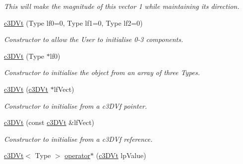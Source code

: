 \begin{DoxyCompactItemize}
\begin{DoxyCompactList}\small\item\em This will make the magnitude of this vector 1 while maintaining its direction. \end{DoxyCompactList}\item 
\hypertarget{classc3_d_vt_ac477f1d395ac545f8e2d2563cd1b4f47}{
\hyperlink{classc3_d_vt_ac477f1d395ac545f8e2d2563cd1b4f47}{c3DVt} (Type lf0=0, Type lf1=0, Type lf2=0)}
\label{classc3_d_vt_ac477f1d395ac545f8e2d2563cd1b4f47}

\begin{DoxyCompactList}\small\item\em Constructor to allow the User to initialise 0-\/3 components. \end{DoxyCompactList}\item 
\hypertarget{classc3_d_vt_aa12012c2fc92268f894b4c50cb58ea29}{
\hyperlink{classc3_d_vt_aa12012c2fc92268f894b4c50cb58ea29}{c3DVt} (Type $\ast$lf0)}
\label{classc3_d_vt_aa12012c2fc92268f894b4c50cb58ea29}

\begin{DoxyCompactList}\small\item\em Constructor to initialise the object from an array of three Types. \end{DoxyCompactList}\item 
\hypertarget{classc3_d_vt_a23c294617b443c3b822123f743f81b42}{
\hyperlink{classc3_d_vt_a23c294617b443c3b822123f743f81b42}{c3DVt} (\hyperlink{classc3_d_vt}{c3DVt} $\ast$lfVect)}
\label{classc3_d_vt_a23c294617b443c3b822123f743f81b42}

\begin{DoxyCompactList}\small\item\em Constructor to initialise from a c3DVf pointer. \end{DoxyCompactList}\item 
\hypertarget{classc3_d_vt_ab7c2382886c4cf854b848ebfaa91efe4}{
\hyperlink{classc3_d_vt_ab7c2382886c4cf854b848ebfaa91efe4}{c3DVt} (const \hyperlink{classc3_d_vt}{c3DVt} \&lfVect)}
\label{classc3_d_vt_ab7c2382886c4cf854b848ebfaa91efe4}

\begin{DoxyCompactList}\small\item\em Constructor to initialise from a c3DVf reference. \end{DoxyCompactList}\item 
\hypertarget{classc3_d_vt_aa4d37192fbdce9242ce40a0e79ff99c3}{
\hyperlink{classc3_d_vt}{c3DVt}$<$ Type $>$ \hyperlink{classc3_d_vt_aa4d37192fbdce9242ce40a0e79ff99c3}{operator$\ast$} (\hyperlink{classc3_d_vt}{c3DVt} lpValue)}
\label{classc3_d_vt_aa4d37192fbdce9242ce40a0e79ff99c3}


\end{DoxyCompactItemize}
